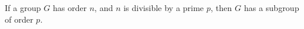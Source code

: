 If a group $G$ has order $n$, and $n$ is divisible by a prime $p$, then
$G$ has a subgroup of order $p$.